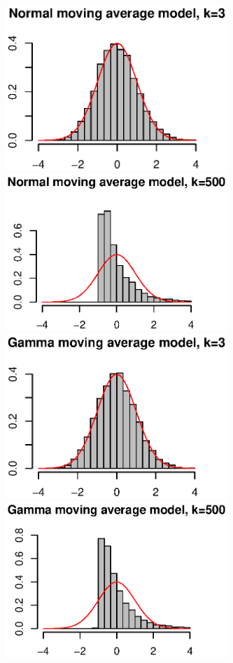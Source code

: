 \documentclass[review]{elsarticle}
\theoremstyle{plain}
\theoremstyle{definition}
\theoremstyle{remark}
\begin{document}
\begin{figure}[htbp]
    \centering
    \includegraphics[width=84mm]{Fig2}
    \includegraphics[width=84mm]{Fig3}\\
    \includegraphics[width=84mm]{Fig4}
    \includegraphics[width=84mm]{Fig5}\\

\end{figure}
\end{document}
